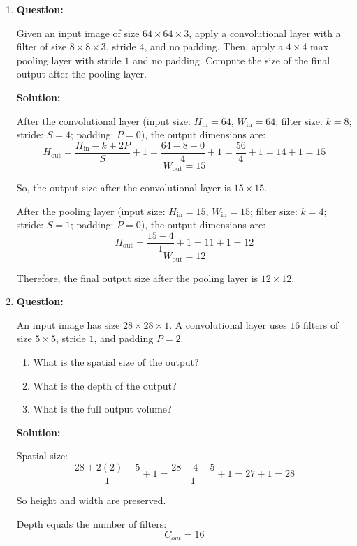 \documentclass{article}
\begin{document}
\begin{enumerate}
    \item \textbf{Question:}

    Given an input image of size \(64 \times 64 \times 3\), apply a convolutional layer with a filter of size \(8 \times 8 \times 3\), stride \(4\), and no padding. Then, apply a \(4 \times 4\) max pooling layer with stride \(1\) and no padding. Compute the size of the final output after the pooling layer.

    \textbf{Solution:}
    
    After the convolutional layer (input size: \(H_{\text{in}} = 64\), \(W_{\text{in}} = 64\); filter size: \(k = 8\); stride: \(S = 4\); padding: \(P = 0\)), the output dimensions are:
    \[
    H_{\text{out}} = \frac{H_{\text{in}} - k + 2P}{S} + 1 = \frac{64 - 8 + 0}{4} + 1 = \frac{56}{4} + 1 = 14 + 1 = 15
    \]
    \[
    W_{\text{out}} = 15
    \]

    So, the output size after the convolutional layer is \(15 \times 15\).

    After the pooling layer (input size: \(H_{\text{in}} = 15\), \(W_{\text{in}} = 15\); filter size: \(k = 4\); stride: \(S = 1\); padding: \(P = 0\)), the output dimensions are:
    \[
    H_{\text{out}} = \frac{15 - 4}{1} + 1 = 11 + 1 = 12
    \]
    \[
    W_{\text{out}} = 12
    \]

    Therefore, the final output size after the pooling layer is \(12 \times 12\).


    \item \textbf{Question:}

An input image has size \(28 \times 28 \times 1\).  
A convolutional layer uses \(16\) filters of size \(5 \times 5\), stride \(1\), and padding \(P=2\).

\begin{enumerate}
\item What is the spatial size of the output?
\item What is the depth of the output?
\item What is the full output volume?
\end{enumerate}

\textbf{Solution:}

Spatial size:
\[
\frac{28 + 2(2) - 5}{1} + 1
= \frac{28 + 4 - 5}{1} + 1
= 27 + 1 = 28
\]

So height and width are preserved.

Depth equals the number of filters:
\[
C_{out} = 16
\]


\end{enumerate}
\end{document}
